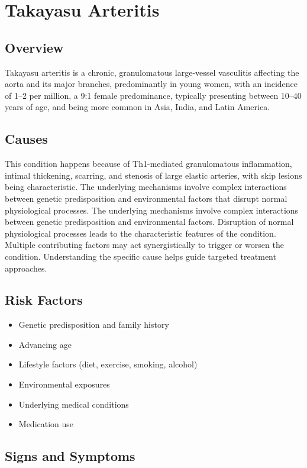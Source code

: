 \chapter{Takayasu Arteritis}
\label{sec:Takayasu Arteritis}

\section{Overview}
Takayasu arteritis is a chronic, granulomatous large-vessel vasculitis affecting the aorta and its major branches, predominantly in young women, with an incidence of 1--2 per million, a 9:1 female predominance, typically presenting between 10--40 years of age, and being more common in Asia, India, and Latin America.
\section{Causes}
This condition happens because of Th1-mediated granulomatous inflammation, intimal thickening, scarring, and stenosis of large elastic arteries, with skip lesions being characteristic. The underlying mechanisms involve complex interactions between genetic predisposition and environmental factors that disrupt normal physiological processes. The underlying mechanisms involve complex interactions between genetic predisposition and environmental factors. Disruption of normal physiological processes leads to the characteristic features of the condition. Multiple contributing factors may act synergistically to trigger or worsen the condition. Understanding the specific cause helps guide targeted treatment approaches.
\section{Risk Factors}


\begin{itemize}[noitemsep]
  \item Genetic predisposition and family history
  \item Advancing age
  \item Lifestyle factors (diet, exercise, smoking, alcohol)
  \item Environmental exposures
  \item Underlying medical conditions
  \item Medication use
\end{itemize}
\section{Signs and Symptoms}

